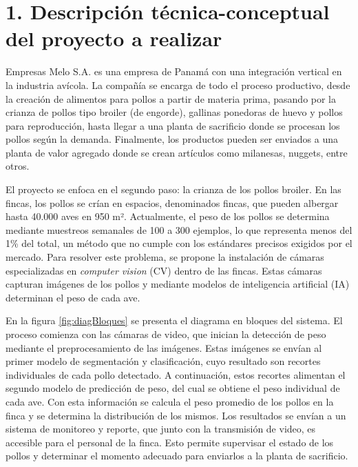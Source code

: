 \documentclass[
11pt, %
]{charter}
\begin{document}
\section{1. Descripción técnica-conceptual del proyecto a realizar}
\label{sec:descripcion}

Empresas Melo S.A. es una empresa de Panamá con una integración vertical en la industria avícola. La compañía se encarga de todo el proceso productivo, desde la creación de alimentos para pollos a partir de materia prima, pasando por la crianza de pollos tipo broiler (de engorde), gallinas ponedoras de huevo y pollos para reproducción, hasta llegar a una planta de sacrificio donde se procesan los pollos según la demanda. Finalmente, los productos pueden ser enviados a una planta de valor agregado donde se crean artículos como milanesas, nuggets, entre otros.

El proyecto se enfoca en el segundo paso: la crianza de los pollos broiler. En las fincas, los pollos se crían en espacios, denominados fincas, que pueden albergar hasta 40.000 aves en 950 m². Actualmente, el peso de los pollos se determina mediante muestreos semanales de 100 a 300 ejemplos, lo que representa menos del 1\% del total, un método que no cumple con los estándares precisos exigidos por el mercado. Para resolver este problema, se propone la instalación de cámaras especializadas en \textit{computer vision} (CV) dentro de las fincas. Estas cámaras capturan imágenes de los pollos y mediante modelos de inteligencia artificial (IA) determinan el peso de cada ave.

En la figura \ref{fig:diagBloques} se presenta el diagrama en bloques del sistema. El proceso comienza con las cámaras de video, que inician la detección de peso mediante el preprocesamiento de las imágenes. Estas imágenes se envían al primer modelo de segmentación y clasificación, cuyo resultado son recortes individuales de cada pollo detectado. A continuación, estos recortes alimentan el segundo modelo de predicción de peso, del cual se obtiene el peso individual de cada ave. Con esta información se calcula el peso promedio de los pollos en la finca y se determina la distribución de los mismos. Los resultados se envían a un sistema de monitoreo y reporte, que junto con la transmisión de video, es accesible para el personal de la finca. Esto permite supervisar el estado de los pollos y determinar el momento adecuado para enviarlos a la planta de sacrificio.
\end{document}
